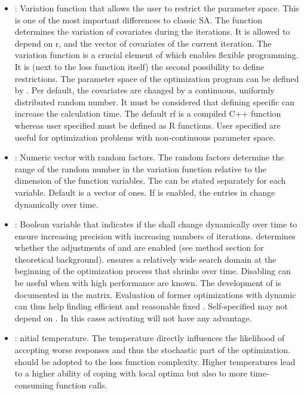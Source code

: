 \begin{itemize}
\item {}: Variation function that allows the user to restrict the parameter space.  This is one of the most important differences to classic SA. The function determines the variation of covariates during the iterations. It is allowed to depend on r,  and the vector of covariates of the current iteration. The variation function is a crucial element of  which enables flexible programming. It is (next to the loss function itself) the second possibility to define restrictions. The parameter space of the optimization program can be defined by . Per default, the covariates are changed by a continuous, uniformly distributed random number. It must be considered that defining specific  can increase the calculation time. The default rf is a compiled C++ function whereas user specified  must be defined as R functions. User specified  are useful for optimization problems with non-continuous parameter space.
\item {}: Numeric vector with random factors. The random factors determine the range of the random number in the variation function  relative to the dimension of the function variables. The  can be stated separately for each variable. Default is a vector of ones. If  is enabled, the entries in  change dynamically over time.
\item {}: Boolean variable that indicates if the  shall change dynamically over time to ensure increasing precision with increasing numbers of iterations.  determines whether the adjustments of \citet{corana_1987} and \citet{pronzato_1984} are enabled (see method section for theoretical background).  ensures a relatively wide search domain at the beginning of the optimization process that shrinks over time. Disabling  can be useful when  with high performance are known. The development of  is documented in the  matrix. Evaluation of former optimizations with dynamic  can thus help finding efficient and reasonable fixed . Self-specified  may not depend on . In this cases activating  will not have any advantage.
\item {}: nitial temperature. The temperature directly influences the likelihood of accepting worse responses and thus the stochastic part of the optimization.  should be adopted to the loss function complexity. Higher temperatures lead to a higher ability of coping with local optima but also to more time-consuming function calls.

\end{itemize}
